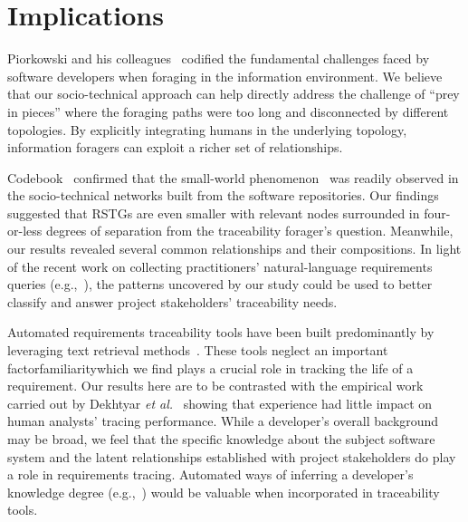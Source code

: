 \documentclass[conference]{IEEEtran}
\begin{document}
\section{Implications}
Piorkowski and his colleagues~\cite{navValueCost} codified the fundamental challenges faced by software developers when foraging in the information environment. We believe that our socio-technical approach can help directly address the challenge of ``prey in pieces'' where the foraging paths were too long and disconnected by different topologies. By explicitly integrating humans in the underlying topology, information foragers can exploit a richer set of relationships.

Codebook~\cite{codebook10} confirmed that the small-world phenomenon~\cite{Chakrabarti-CSUR06} was readily observed in the socio-technical networks built from the software repositories. Our findings suggested that RSTGs are even smaller with relevant nodes surrounded in four-or-less degrees of separation from the traceability forager's question. Meanwhile, our results revealed several common relationships and their compositions. In light of the recent work on collecting practitioners' natural-language requirements queries (e.g.,~\cite{Pruski-REJ15, Lohar-REFSQ16, Malviya-RE17}), the patterns uncovered by our study could be used to better classify and answer project stakeholders' traceability needs.

Automated requirements traceability tools have been built predominantly by leveraging text retrieval methods~\cite{ICSE15}. These tools neglect an important factor\textemdash familiarity\textemdash which we find plays a crucial role in tracking the life of a requirement. Our results here are to be contrasted with the empirical work carried out by Dekhtyar \emph{et al.}~\cite{Dekhtyar-RE11} showing that experience had little impact on human analysts' tracing performance. While a developer's overall background may be broad, we feel that the specific knowledge about the subject software system and the latent relationships established with project stakeholders do play a role in requirements tracing. Automated ways of inferring a developer's knowledge degree (e.g.,~\cite{Fritz-TOSEM14}) would be valuable when incorporated in traceability tools.


\end{document}
